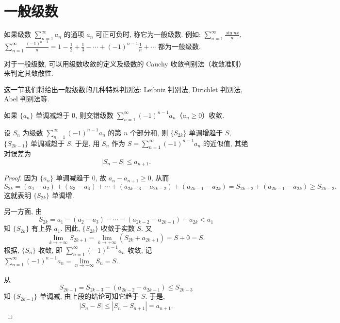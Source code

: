 \section{一般级数}\label{sec:12.3}

如果级数 $\sum_{n=1}^{\infty}a_{n}$ 的通项 $a_{n}$ 可正可负时, 称它为一般级数. 例如: $\sum_{n=1}^{\infty}\frac{\sin nx}{n}$, $\sum_{n=1}^{\infty}\frac{(-1)^{n-1}}{n}=1-\frac{1}{2}+\frac{1}{3}-\cdots+(-1)^{n-1}\frac{1}{n}+\cdots$ 都为一般级数.

对于一般级数, 可以用级数收敛的定义及级数的 Cauchy 收敛判别法（收敛准则）来判定其敛散性.

这一节我们将给出一般级数的几种特殊判别法: Leibniz 判别法, Dirichlet 判别法, Abel 判别法等.

\begin{theorem}\label{thm:12.3.1}
如果 $\{a_{n}\}$ 单调减趋于 $0$, 则交错级数 $\sum_{n=1}^{\infty}(-1)^{n-1}a_{n}$（$a_{n}\geqslant0$）收敛.

设 $S_{n}$ 为级数 $\sum_{n=1}^{\infty}(-1)^{n-1}a_{n}$ 的第 $n$ 个部分和, 则 $\{S_{2k}\}$ 单调增趋于 $S$, $\{S_{2k-1}\}$ 单调减趋于 $S$. 于是, 用 $S_{n}$ 作为 $S=\sum_{n=1}^{\infty}(-1)^{n-1}a_{n}$ 的近似值, 其绝对误差为
\[
  |S_{n}-S|\leqslant a_{n+1}.
\]
\end{theorem}

\begin{proof}
因为 $\{a_{n}\}$ 单调减趋于 $0$, 故 $a_{n}-a_{n+1}\geqslant0$, 从而
\[
  S_{2k}=(a_{1}-a_{2})+(a_{3}-a_{4})+\cdots+(a_{2k-3}-a_{2k-2})+(a_{2k-1}-a_{2k})
  =S_{2k-2}+(a_{2k-1}-a_{2k})\geqslant S_{2k-2}.
\]
这就表明 $\{S_{2k}\}$ 单调增.

另一方面, 由
\[
  S_{2k}=a_{1}-(a_{2}-a_{3})-\cdots-(a_{2k-2}-a_{2k-1})-a_{2k}<a_{1}
\]
知 $\{S_{2k}\}$ 有上界 $a_{1}$. 因此, $\{S_{2k}\}$ 收敛于实数 $S$. 又
\[
  \lim_{k\to+\infty}S_{2k+1}=\lim_{k\to+\infty}(S_{2k}+a_{2k+1})=S+0=S.
\]
根据, $\{S_{n}\}$ 收敛, 即 $\sum_{n=1}^{\infty}(-1)^{n-1}a_{n}$ 收敛, 记 $\sum_{n=1}^{\infty}(-1)^{n-1}a_{n}=\lim\limits_{n\to+\infty}S_{n}=S$.

从
\[
  S_{2k-1}=S_{2k-3}-(a_{2k-2}-a_{2k-1})\leqslant S_{2k-3}
\]
知 $\{S_{2k-1}\}$ 单调减, 由上段的结论可知它趋于 $S$. 于是,
\[
  |S_{n}-S|\leqslant|S_{n}-S_{n+1}|=a_{n+1}.
\]
\end{proof}

